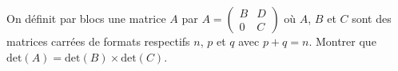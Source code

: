 \documentclass{book}
\begin{document}
\begin{Exercice}
 On définit par blocs une matrice $A$ par $A=\left(
\begin{array}{cc}
B&D\\
0&C
\end{array}
\right)$ où $A$, $B$ et $C$ sont des matrices carrées de formats respectifs $n$, $p$ et $q$ avec $p+q=n$. Montrer que $\text{det}(A)=\text{det}(B)\times\text{det}(C)$.
\end{Exercice}
%
%
%
%
%
%
%
%
%
%

%
%
%
%
%
%
%
%
%
%
%
%
%
%
\end{document}
